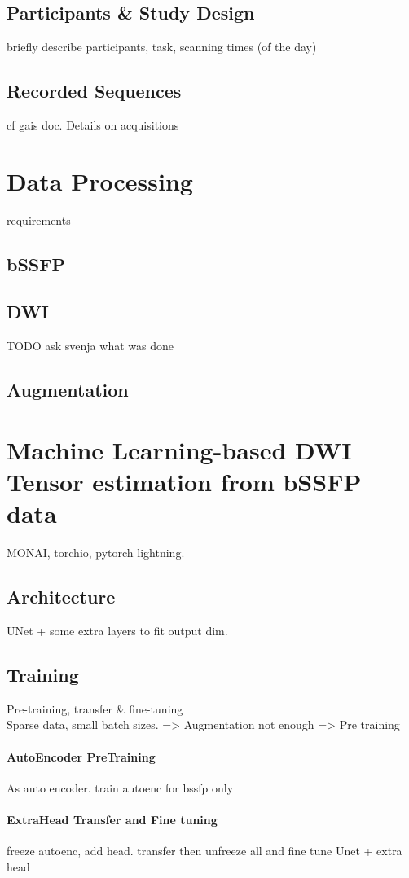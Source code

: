 \subsection{Participants \& Study Design}
briefly describe participants, task, scanning times (of the day)

\subsection{Recorded Sequences}
cf gais doc.
Details on acquisitions

\section{Data Processing}
requirements
\subsection{bSSFP}

\subsection{DWI}
TODO ask svenja what was done

\subsection{Augmentation}


\section{Machine Learning-based DWI Tensor estimation from bSSFP data}
MONAI, torchio, pytorch lightning. 

\subsection{Architecture}
UNet + some extra layers to fit output dim.

\subsection{Training}
Pre-training, transfer \& fine-tuning \\

Sparse data, small batch sizes. => Augmentation not enough => Pre training
\paragraph{AutoEncoder PreTraining}
As auto encoder. train autoenc for bssfp only 

\paragraph{ExtraHead Transfer and Fine tuning}
freeze autoenc, add head. transfer then unfreeze all and fine tune
Unet + extra head
